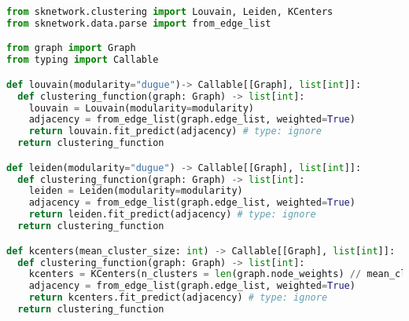   \begin{lstlisting}[language=Python,caption=\texttt{clustering.py},label=lst:clustering.py]
from sknetwork.clustering import Louvain, Leiden, KCenters
from sknetwork.data.parse import from_edge_list

from graph import Graph
from typing import Callable

def louvain(modularity="dugue")-> Callable[[Graph], list[int]]:
  def clustering_function(graph: Graph) -> list[int]:
    louvain = Louvain(modularity=modularity)
    adjacency = from_edge_list(graph.edge_list, weighted=True)
    return louvain.fit_predict(adjacency) # type: ignore
  return clustering_function

def leiden(modularity="dugue") -> Callable[[Graph], list[int]]:
  def clustering_function(graph: Graph) -> list[int]:
    leiden = Leiden(modularity=modularity)
    adjacency = from_edge_list(graph.edge_list, weighted=True)
    return leiden.fit_predict(adjacency) # type: ignore
  return clustering_function

def kcenters(mean_cluster_size: int) -> Callable[[Graph], list[int]]:
  def clustering_function(graph: Graph) -> list[int]:
    kcenters = KCenters(n_clusters = len(graph.node_weights) // mean_cluster_size)
    adjacency = from_edge_list(graph.edge_list, weighted=True)
    return kcenters.fit_predict(adjacency) # type: ignore
  return clustering_function
  \end{lstlisting}

